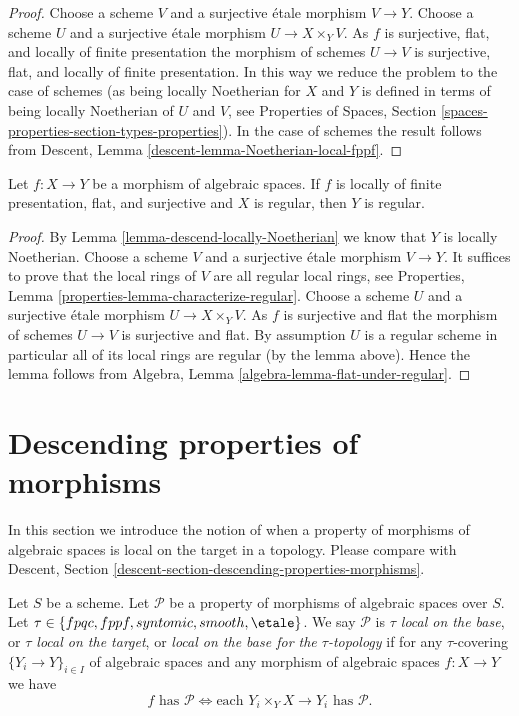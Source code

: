 \begin{proof}
Choose a scheme $V$ and a surjective \'etale morphism $V \to Y$.
Choose a scheme $U$ and a surjective \'etale morphism
$U \to X \times_Y V$. As $f$ is surjective, flat, and locally of
finite presentation the morphism of schemes $U \to V$ is surjective, flat, and
locally of finite presentation. In this way we reduce the
problem to the case of schemes (as being locally Noetherian for $X$ and $Y$
is defined in terms of being locally Noetherian of $U$ and $V$, see
Properties of Spaces,
Section \ref{spaces-properties-section-types-properties}).
In the case of schemes the result follows from
Descent, Lemma \ref{descent-lemma-Noetherian-local-fppf}.
\end{proof}

\begin{lemma}
\label{lemma-descend-regular}
Let $f : X \to Y$ be a morphism of algebraic spaces.
If $f$ is locally of finite presentation, flat, and surjective and
$X$ is regular, then $Y$ is regular.
\end{lemma}

\begin{proof}
By
Lemma \ref{lemma-descend-locally-Noetherian}
we know that $Y$ is locally Noetherian.
Choose a scheme $V$ and a surjective \'etale morphism $V \to Y$.
It suffices to prove that the local rings of $V$ are all regular local
rings, see
Properties, Lemma \ref{properties-lemma-characterize-regular}.
Choose a scheme $U$ and a surjective \'etale morphism
$U \to X \times_Y V$. As $f$ is surjective and flat the morphism of schemes
$U \to V$ is surjective and flat. By assumption $U$ is a regular scheme
in particular all of its local rings are regular (by the lemma above).
Hence the lemma follows from
Algebra, Lemma \ref{algebra-lemma-flat-under-regular}.
\end{proof}



\section{Descending properties of morphisms}
\label{section-descending-properties-morphisms}

\noindent
In this section we introduce the notion of when a property of morphisms of
algebraic spaces is local on the target in a topology. Please compare with
Descent, Section \ref{descent-section-descending-properties-morphisms}.

\begin{definition}
\label{definition-property-morphisms-local}
Let $S$ be a scheme.
Let $\mathcal{P}$ be a property of morphisms of algebraic spaces over $S$.
Let $\tau \in \{fpqc, fppf, syntomic, smooth, \etale\}$.
We say $\mathcal{P}$ is {\it $\tau$ local on the base}, or
{\it $\tau$ local on the target}, or
{\it local on the base for the $\tau$-topology} if for any
$\tau$-covering $\{Y_i \to Y\}_{i \in I}$ of algebraic spaces
and any morphism of algebraic spaces $f : X \to Y$ we
have
$$
f \text{ has }\mathcal{P}
\Leftrightarrow
\text{each }Y_i \times_Y X \to Y_i\text{ has }\mathcal{P}.
$$
\end{definition}

